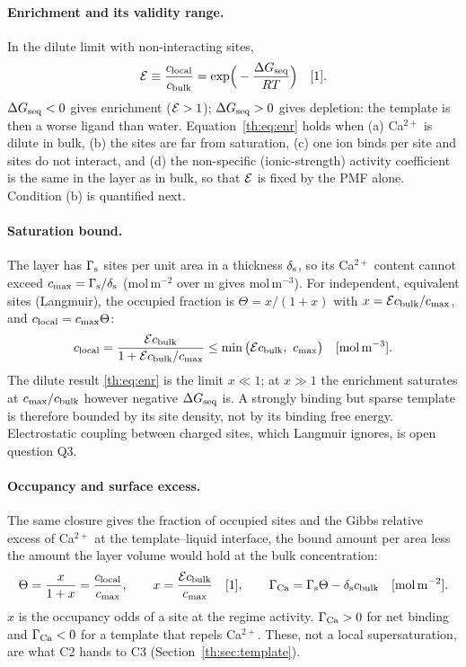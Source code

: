 \paragraph{Enrichment and its validity range.} In the dilute limit with non-interacting sites,
\begin{equation}\label{th:eq:enr}
\mathcal{E}\equiv\frac{c_\mathrm{local}}{c_\mathrm{bulk}}=\exp\!\Big(-\frac{\Delta G_\mathrm{seq}}{R T}\Big) \quad[\mathrm{1}].
\end{equation}
$\Delta G_\mathrm{seq}<0$ gives enrichment ($\mathcal{E}>1$); $\Delta G_\mathrm{seq}>0$ gives depletion: the template is then a worse
ligand than water. Equation~\eqref{th:eq:enr} holds when (a) Ca$^{2+}$ is dilute in bulk, (b)
the sites are far from saturation, (c) one ion binds per site and sites do not interact, and (d)
the non-specific (ionic-strength) activity coefficient is the same in the layer as in bulk, so
that $\mathcal{E}$ is fixed by the PMF alone. Condition (b) is quantified next.

\paragraph{Saturation bound.} The layer has $\Gamma_\mathrm{s}$ sites per unit area in a thickness $\delta_\mathrm{s}$, so
its Ca$^{2+}$ content cannot exceed $c_\mathrm{max}=\Gamma_\mathrm{s}/\delta_\mathrm{s}$ (mol\,m$^{-2}$ over m gives mol\,m$^{-3}$).
For independent, equivalent sites (Langmuir), the occupied fraction is
$\Theta=x/(1+x)$ with $x=\mathcal{E}c_\mathrm{bulk}/c_\mathrm{max}$, and $c_\mathrm{local}=c_\mathrm{max}\Theta$:
\begin{equation}\label{th:eq:langmuir}
c_\mathrm{local}=\frac{\mathcal{E}c_\mathrm{bulk}}{1+\mathcal{E}c_\mathrm{bulk}/c_\mathrm{max}}\le\min\big(\mathcal{E}c_\mathrm{bulk},\ c_\mathrm{max}\big) \quad[\mathrm{mol\,m^{-3}}].
\end{equation}
The dilute result \eqref{th:eq:enr} is the limit $x\ll1$; at $x\gg1$ the enrichment saturates at
$c_\mathrm{max}/c_\mathrm{bulk}$ however negative $\Delta G_\mathrm{seq}$ is. A strongly binding but sparse template is therefore
bounded by its site density, not by its binding free energy. Electrostatic coupling between
charged sites, which Langmuir ignores, is open question Q3.

\paragraph{Occupancy and surface excess.} The same closure gives the fraction of occupied sites
and the Gibbs relative excess of Ca$^{2+}$ at the template--liquid interface, the bound amount
per area less the amount the layer volume would hold at the bulk concentration:
\begin{equation}\label{th:eq:excess}
\Theta=\frac{x}{1+x}=\frac{c_\mathrm{local}}{c_\mathrm{max}},\qquad x=\frac{\mathcal{E}c_\mathrm{bulk}}{c_\mathrm{max}} \quad[\mathrm{1}],\qquad
\Gamma_\mathrm{Ca}=\Gamma_\mathrm{s}\Theta-\delta_\mathrm{s}c_\mathrm{bulk} \quad[\mathrm{mol\,m^{-2}}].
\end{equation}
$x$ is the occupancy odds of a site at the regime activity. $\Gamma_\mathrm{Ca}>0$ for net binding and
$\Gamma_\mathrm{Ca}<0$ for a template that repels Ca$^{2+}$. These, not a local supersaturation, are what
C2 hands to C3 (Section~\ref{th:sec:template}).

